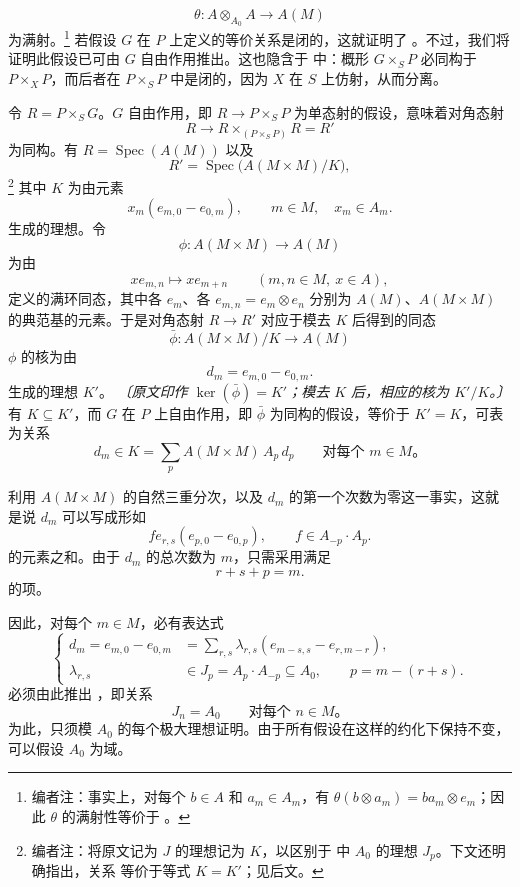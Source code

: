 \[
  \theta:A\otimes_{A_0}A\longrightarrow A(M)
\]
为满射。\footnote{编者注：事实上，对每个 \(b\in A\) 和 \(a_m\in A_m\)，有 \(\theta(b\otimes a_m)=ba_m\otimes e_m\)；因此 \(\theta\) 的满射性等价于 。}
若假设 \(G\) 在 \(P\) 上定义的等价关系是闭的，这就证明了 。不过，我们将证明此假设已可由 \(G\) 自由作用推出。这也隐含于 中：概形 \(G\times_SP\) 必同构于 \(P\times_XP\)，而后者在 \(P\times_SP\) 中是闭的，因为 \(X\) 在 \(S\) 上仿射，从而分离。

令 \(R=P\times_SG\)。\(G\) 自由作用，即 \(R\to P\times_SP\) 为单态射的假设，意味着对角态射
\[
  R\longrightarrow
  R\times_{(P\times_SP)}R=R'
\]
为同构。有 \(R=\operatorname{Spec}(A(M))\) 以及
\[
  R'=\operatorname{Spec}\bigl(A(M\times M)/K\bigr),
\]
\footnote{编者注：将原文记为 \(J\) 的理想记为 \(K\)，以区别于  中 \(A_0\) 的理想 \(J_p\)。下文还明确指出，关系  等价于等式 \(K=K'\)；见后文。}
其中 \(K\) 为由元素
\[
  x_m(e_{m,0}-e_{0,m}),
  \qquad m\in M,\quad x_m\in A_m.
\]
生成的理想。令
\[
  \phi:A(M\times M)\longrightarrow A(M)
\]
为由
\[
  x e_{m,n}\longmapsto x e_{m+n}
  \qquad (m,n\in M,\ x\in A),
\]
定义的满环同态，其中各 \(e_m\)、各 \(e_{m,n}=e_m\otimes e_n\) 分别为 \(A(M)\)、\(A(M\times M)\) 的典范基的元素。于是对角态射 \(R\to R'\) 对应于模去 \(K\) 后得到的同态
\[
  \bar\phi:A(M\times M)/K\longrightarrow A(M)
\]
\(\phi\) 的核为由
\[
  d_m=e_{m,0}-e_{0,m}.
\]
生成的理想 \(K'\)。
\emph{〔原文印作 \(\ker(\bar\phi)=K'\)；模去 \(K\) 后，相应的核为 \(K'/K\)。〕}
有 \(K\subseteq K'\)，而 \(G\) 在 \(P\) 上自由作用，即 \(\bar\phi\) 为同构的假设，等价于 \(K'=K\)，可表为关系
\[
  d_m\in K=\sum_p A(M\times M)\,A_p\,d_p
  \qquad\text{对每个 \(m\in M\)。}
  \tag{xx}\label{sga3:viii:theorem:5:1:eq:xx:01}
\]

利用 \(A(M\times M)\) 的自然三重分次，以及 \(d_m\) 的第一个次数为零这一事实，这就是说 \(d_m\) 可以写成形如
\[
  f e_{r,s}(e_{p,0}-e_{0,p}),
  \qquad f\in A_{-p}\cdot A_p.
\]
的元素之和。由于 \(d_m\) 的总次数为 \(m\)，只需采用满足
\[
  r+s+p=m.
\]
的项。

因此，对每个 \(m\in M\)，必有表达式
\[
  \left\{
  \begin{aligned}
    d_m=e_{m,0}-e_{0,m}
      &=\sum_{r,s}\lambda_{r,s}
        (e_{m-s,s}-e_{r,m-r}),\\
    \lambda_{r,s}&\in J_p=A_p\cdot A_{-p}\subseteq A_0,
      \qquad p=m-(r+s).
  \end{aligned}
  \right.
  \tag{xxx}\label{sga3:viii:theorem:5:1:eq:xxx:01}
\]
必须由此推出 ，即关系
\[
  J_n=A_0
  \qquad\text{对每个 \(n\in M\)。}
  \tag{xxxx}\label{sga3:viii:theorem:5:1:eq:xxxx:01}
\]
为此，只须模 \(A_0\) 的每个极大理想证明。由于所有假设在这样的约化下保持不变，可以假设 \(A_0\) 为域。

